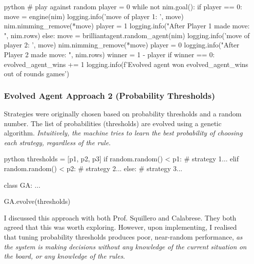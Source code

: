 \begin{mintedbox}{python}
        # play against random
        player = 0
        while not nim.goal():
            if player == 0:
                move = engine(nim)
                logging.info('move of player 1: ', move)
                nim.nimming_remove(*move)
                player = 1
                logging.info("After Player 1 made move: ", nim.rows)
            else:
                move = brilliantagent.random_agent(nim)
                logging.info('move of player 2: ', move)
                nim.nimming_remove(*move)
                player = 0
                logging.info("After Player 2 made move: ", nim.rows)
        winner = 1 - player
        if winner == 0:
            evolved_agent_wins += 1
    logging.info(f'Evolved agent won {evolved_agent_wins} out of {rounds} games')
\end{mintedbox}

\subsubsection{Evolved Agent Approach 2 (Probability Thresholds)}

Strategies were originally chosen based on probability thresholds and a random number. The list of probabilities (thresholds) are evolved using a genetic algorithm. \emph{Intuitively, the machine tries to learn the best probability of choosing each strategy, regardless of the rule.}

\begin{mintedbox}{python}
    thresholds = [p1, p2, p3]
    if random.random() < p1:
        # strategy 1...
    elif random.random() < p2:
        # strategy 2...
    else:
        # strategy 3...

    class GA:
        ...

    GA.evolve(thresholds)
\end{mintedbox}

I discussed this approach with both Prof. Squillero and Calabrese. They both agreed that this was worth exploring. However, upon implementing, I realised that tuning probability thresholds produces poor, near-random performance, \emph{as the system is making decisions without any knowledge of the current situation on the board, or any knowledge of the rules}.

